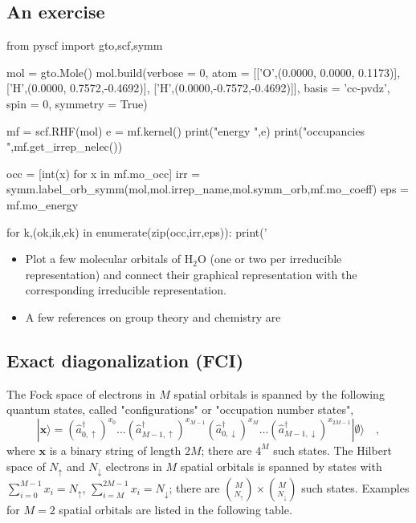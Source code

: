 \documentclass{article}
\newcommand{\pos}[1]{\mathbf{#1}}
\newcommand{\CRE}[1]{\hat{a}^\dagger_{#1}}
\begin{document}
\subsection{An exercise}

\begin{python}
from pyscf import gto,scf,symm
  
mol = gto.Mole()
mol.build(verbose  = 0,
          atom     = [['O',(0.0000, 0.0000, 0.1173)],
                      ['H',(0.0000, 0.7572,-0.4692)],
                      ['H',(0.0000,-0.7572,-0.4692)]],
          basis    = 'cc-pvdz',
          spin     = 0,
          symmetry = True)

mf = scf.RHF(mol)
e  = mf.kernel()
print("energy      ",e)
print("occupancies ",mf.get_irrep_nelec())

occ = [int(x) for x in mf.mo_occ]
irr = symm.label_orb_symm(mol,mol.irrep_name,mol.symm_orb,mf.mo_coeff)
eps = mf.mo_energy

for k,(ok,ik,ek) in enumerate(zip(occ,irr,eps)):
    print('%
\end{python}

\begin{itemize}
\item Plot a few molecular orbitals of H$_2$O (one or two per irreducible representation) and connect 
their graphical representation with the corresponding irreducible representation.
\item A few references on group theory and chemistry are \cite{levine1988physical,tinkham2003group}
\end{itemize}

\pagebreak
\newpage

\subsection{Exact diagonalization (FCI)}

The Fock space of electrons in $M$ spatial orbitals is spanned by the following quantum states, called "configurations" or "occupation number states",
\begin{equation}
| \pos{x} \rangle = (\CRE{0,\uparrow})^{x_0} \dots (\CRE{M-1 ,\uparrow})^{x_{M-1}} (\CRE{0,\downarrow})^{x_M} \dots (\CRE{M-1,\downarrow})^{x_{2M-1}} | \emptyset \rangle \quad ,
\end{equation}
where $\pos{x}$ is a binary string of length $2M$; there are $4^M$ such states. The Hilbert space of $N_\uparrow$ and $N_\downarrow$ electrons in $M$ spatial orbitals is
spanned by states with $\sum_{i=0}^{M-1} x_i = N_\uparrow$, $\sum_{i=M}^{2M-1} x_i = N_\downarrow$; there are $\binom{M}{N_\uparrow} \times \binom{M}{N_\downarrow}$ such states.
Examples for $M=2$ spatial orbitals are listed in the following table. 
\end{document}
